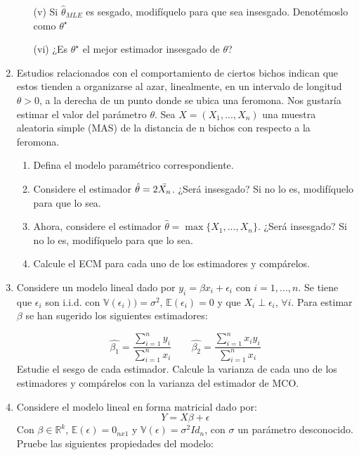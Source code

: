 \begin{enumerate}
\begin{itemize}
    \item[(v)] Si $\hat{\theta}_{MLE}$ es sesgado, modifíquelo para que sea insesgado. Denotémoslo como $\theta^{\star}$
    
    \item[(vi)] ¿Es $\theta^{\star}$ el mejor estimador insesgado de $\theta$?
\end{itemize}

\item Estudios relacionados con el comportamiento de ciertos bichos indican que estos tienden a organizarse al azar, linealmente, en un intervalo de longitud $\theta > 0$, a la derecha de un punto donde se ubica una feromona. Nos gustaría estimar el valor del parámetro $\theta$. Sea $X=(X_1,...,X_n)$ una muestra aleatoria simple (MAS) de la distancia de n bichos con respecto a la feromona.

\begin{enumerate}
    \item Defina el modelo paramétrico correspondiente.
    \item Considere el estimador $\hat{\theta}=2\Bar{X_n}$. ¿Será insesgado? Si no lo es, modifíquelo para que lo sea.
    \item Ahora, considere el estimador $\hat{\theta}=\max\{ X_1,...,X_n\}$. ¿Será insesgado? Si no lo es, modifíquelo para que lo sea.
    \item Calcule el ECM para cada uno de los estimadores y compárelos.
\end{enumerate}

\item
Considere un modelo lineal dado por $y_i=\beta x_i +\epsilon_i$ con $i=1,...,n$. Se tiene que $\epsilon_i$ son i.i.d. con $\mathbb{V}(\epsilon_i))=\sigma^2$, $\mathbb{E}(\epsilon_i)=0$ y que $X_i\perp \epsilon_i$, $\forall i$. Para estimar $\beta$ se han sugerido los siguientes estimadores:

\[\hat{\beta_1}=\frac{\sum\limits_{i=1}^{n}y_i}{\sum\limits_{i=1}^{n}x_i} \qquad\hat{\beta_2}=\frac{\sum\limits_{i=1}^{n}x_i y_i}{\sum\limits_{i=1}^{n}x_i} \]
Estudie el sesgo de cada estimador. Calcule la varianza de cada uno de los estimadores y compárelos con la varianza del estimador de MCO.

\item Considere el modelo lineal en forma matricial dado por:
\[Y=X\beta +\epsilon\]
Con $\beta\in\mathbb{R}^k$, $\mathbb{E}(\epsilon)=0_{nx1}$ y $\mathbb{V}(\epsilon)=\sigma^2Id_{n}$, con $\sigma$ un parámetro desconocido. Pruebe las siguientes propiedades del modelo:


\end{enumerate}
